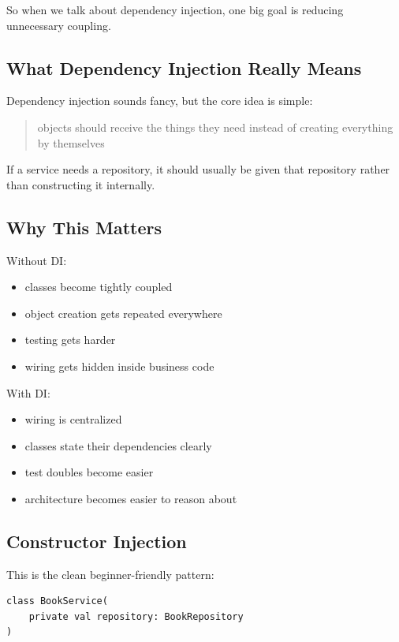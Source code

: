 \documentclass[11pt,a4paper]{article}
\begin{document}
So when we talk about dependency injection, one big goal is reducing unnecessary coupling.

\subsection{What Dependency Injection Really Means}

Dependency injection sounds fancy, but the core idea is simple:

\begin{quote}
objects should receive the things they need instead of creating everything by themselves
\end{quote}

If a service needs a repository, it should usually be given that repository rather than constructing it internally.

\subsection{Why This Matters}

Without DI:
\begin{itemize}
    \item classes become tightly coupled
    \item object creation gets repeated everywhere
    \item testing gets harder
    \item wiring gets hidden inside business code
\end{itemize}

With DI:
\begin{itemize}
    \item wiring is centralized
    \item classes state their dependencies clearly
    \item test doubles become easier
    \item architecture becomes easier to reason about
\end{itemize}

\subsection{Constructor Injection}

This is the clean beginner-friendly pattern:

\begin{lstlisting}[style=kazekotlin]
class BookService(
    private val repository: BookRepository
)
\end{lstlisting}
\end{document}
